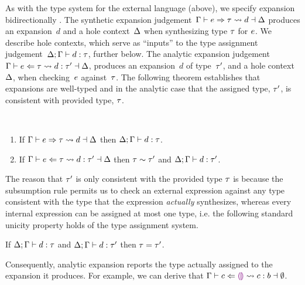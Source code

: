 As with the type system for the external language (above), 
we specify expansion bidirectionally \cite{DBLP:conf/ppdp/FerreiraP14}.
%
The synthetic expansion judgement~$\Gamma \vdash e \Rightarrow \tau \leadsto d \dashv \Delta$  
%
produces an expansion~$d$ and a hole context~$\Delta$ when synthesizing type $\tau$ for $e$. 
%
We describe hole contexts, which serve as ``inputs'' to the type assignment judgement~$\Delta; \Gamma \vdash d : \tau$, further below. 
%
The analytic expansion judgement~$\Gamma \vdash e \Leftarrow \tau \leadsto d : \tau' \dashv \Delta$, produces an expansion~$d$ of type~$\tau'$, and a hole context~$\Delta$, when checking~$e$ against~$\tau$.
%
The following theorem establishes that expansions are well-typed and in the analytic case that the assigned type, $\tau'$, is consistent with provided type, $\tau$.
%
\begin{thm}\label{thm:typed-expansion} ~
  \begin{enumerate}[nolistsep]
    \item
      If $\Gamma \vdash e \Rightarrow \tau \leadsto d \dashv \Delta$
      then $\Delta; \Gamma \vdash d : \tau$.
    \item
      If $\Gamma \vdash e \Leftarrow \tau \leadsto d : \tau' \dashv \Delta$
      then $\tau \sim \tau'$ and $\Delta; \Gamma \vdash d : \tau'$.
  \end{enumerate}
\end{thm}
\noindent
%
%
The reason that $\tau'$ is only consistent with the provided type $\tau$ is because 
%
 the subsumption rule permits us
to check an external expression against any type consistent with the
type that the expression \emph{actually} synthesizes, whereas every internal
expression can be assigned at most one type, i.e. the following
standard unicity property holds of the type assignment system.
%
\begin{thm}
  If $\Delta; \Gamma \vdash d : \tau$
  and $\Delta; \Gamma \vdash d : \tau'$
  then $\tau=\tau'$.
\end{thm}
\noindent
Consequently, analytic expansion reports the type actually assigned to the expansion it produces.
%
For example, we can derive that $\Gamma \vdash c \Leftarrow \textcolor{violet}{\llparenthesis}\textcolor{violet}{\rrparenthesis} \leadsto c : b \dashv \emptyset$.%

